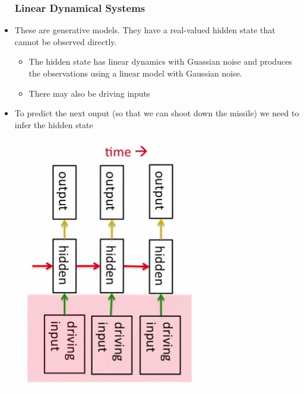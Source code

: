 \begin{itemize}
	\subsubsection{Linear Dynamical Systems}
	\item These are generative models. They have a real-valued hidden state that cannot be observed directly.
	\begin{itemize}
		\item The hidden state has linear dynamics with Guassian noise and produces the observations using a linear model with Gaussian noise.
		\item There may also be driving inputs
	\end{itemize}
	\item To predict the next ouput (so that we can shoot down the missile) we need to infer the hidden state
	\begin{center}
		\includegraphics[scale=0.7]{sections/7/lds.png}
	\end{center}
	

\end{itemize}
